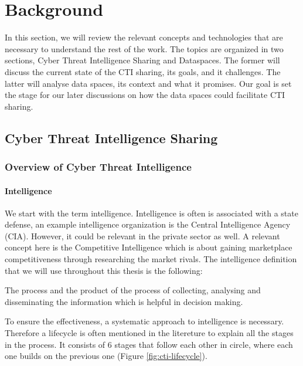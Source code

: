 \chapter{Background}
In this section, we will review the relevant concepts and technologies that are necessary to understand the rest of the work. The topics are organized in two sections, Cyber Threat Intelligence Sharing and Dataspaces. The former will discuss the current state of the CTI sharing, its goals, and it challenges. The latter will analyse data spaces, its context and what it promises. Our goal is set the stage for our later discussions on how the data spaces could facilitate CTI sharing. 

\section{Cyber Threat Intelligence Sharing}

\subsection{Overview of Cyber Threat Intelligence}

\subsubsection{Intelligence}
We start with the term intelligence. 
Intelligence is often is associated with a state defense, an example intelligence organization is the Central Intelligence Agency (CIA). 
However, it could be relevant in the private sector as well. 
A relevant concept here is the Competitive Intelligence which is about gaining marketplace competitiveness through researching the market rivals. The intelligence definition that we will use throughout this thesis is the following:

\smallskip
The process and the product of the process of collecting, analysing and disseminating the information which is helpful in decision making.

To ensure the effectiveness, a systematic approach to intelligence is necessary. Therefore a lifecycle is often mentioned in the litereture to explain all the stages in the process. It consists of 6 stages that follow each other in circle, where each one builds on the previous one (Figure \ref{fig:cti-lifecycle}).

